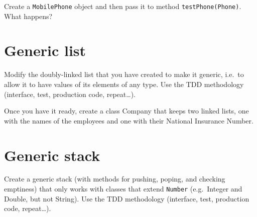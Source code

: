 \documentclass{article}
\begin{document}
Create a \verb+MobilePhone+ object and then pass it to method
\verb+testPhone(Phone)+. What happens?

\section{Generic list}
\label{sec:generic-list}

Modify the doubly-linked list that you have created to make it
generic, i.e.~to allow it to have values of its elements of any
type. Use the TDD methodology (interface, test, production code,
repeat\ldots).

Once you have it ready, create a class Company that keeps two linked
lists, one with the names of the employees and one with their National
Insurance Number. 

\section{Generic stack}
\label{sec:generic-stack}

Create a generic stack (with methods for pushing, poping, and checking
emptiness) that only works with classes that extend \verb+Number+
(e.g.~Integer and Double, but not String). Use the TDD methodology
(interface, test, production code, repeat\ldots).
\end{document}
